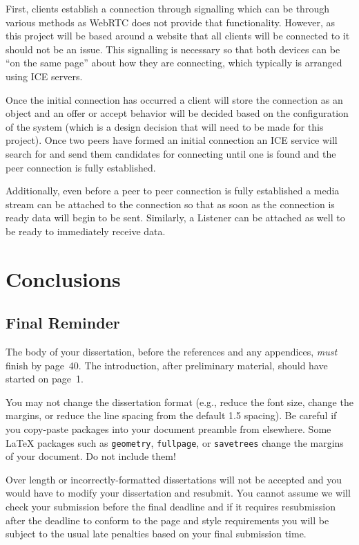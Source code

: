 \documentclass[bsc,frontabs,singlespacing,parskip,deptreport]{infthesis}
\begin{document}
First, clients establish a connection through signalling which can be through various methods as WebRTC does not provide that functionality.  However, as this project will be based around a website that all clients will be connected to it should not be an issue. This signalling is necessary so that both devices can be “on the same page” about how they are connecting, which typically is arranged using ICE servers.

Once the initial connection has occurred a client will store the connection as an object and an offer or accept behavior will be decided based on the configuration of the system (which is a design decision that will need to be made for this project).  Once two peers have formed an initial connection an ICE service will search for and send them candidates for connecting until one is found and the peer connection is fully established.

Additionally, even before a peer to peer connection is fully established a media stream can be attached to the connection so that as soon as the connection is ready data will begin to be sent.  Similarly, a Listener can be attached as well to be ready to immediately receive data.

\chapter{Conclusions}

\section{Final Reminder}

The body of your dissertation, before the references and any appendices,
\emph{must} finish by page~40. The introduction, after preliminary material,
should have started on page~1.

You may not change the dissertation format (e.g., reduce the font size, change
the margins, or reduce the line spacing from the default 1.5 spacing). Be
careful if you copy-paste packages into your document preamble from elsewhere.
Some \LaTeX{} packages such as \texttt{geometry}, \texttt{fullpage}, or
\texttt{savetrees} change the margins of your document. Do not include them!

Over length or incorrectly-formatted dissertations will not be accepted and you
would have to modify your dissertation and resubmit. You cannot assume we will
check your submission before the final deadline and if it requires resubmission
after the deadline to conform to the page and style requirements you will be
subject to the usual late penalties based on your final submission time.
\end{document}

